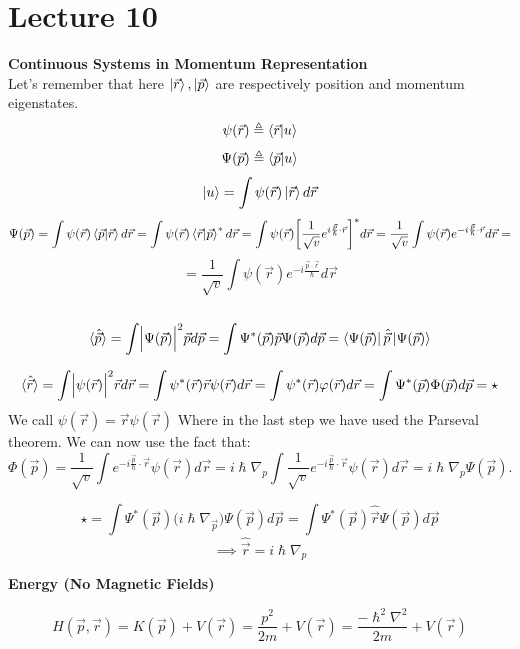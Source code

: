 \documentclass{article}
\begin{document}
\section{Lecture 10}
\textbf{Continuous Systems in Momentum Representation}\\
Let's remember that here $\ket{\vec{r}},\ket{\vec{p}}$ are respectively position and momentum eigenstates.
$$\psi(\vec{r}) \triangleq \bra{\vec{r}}\ket{u}$$
$$\Psi(\vec{p}) \triangleq \bra{\vec{p}}\ket{u}$$
$$\ket{u} = \int \psi (\vec{r}) \ket{\vec{r}} d\vec{r}$$
$$\Psi(\vec{p}) = \int \psi(\vec{r}) \bra{\vec{p}}\ket{\vec{r}}d\vec{r} = \int \psi(\vec{r}) \bra{\vec{r}}\ket{\vec{p}}^* d\vec{r} =  \int \psi(\vec{r}) \biggl[ \frac{1}{\sqrt{v}}e^{i\frac{\vec{p}}{\hslash}\cdot\vec{r}}\biggl]^*d\vec{r} =  \frac{1}{\sqrt{v}} \int \psi(\vec{r}) e^{-i\frac{\vec{p}}{\hslash}\cdot\vec{r}}d\vec{r} = $$
$$=\frac{1}{\sqrt{v}} \int \psi(\vec{r}) e^{-i \frac{\vec{p}\cdot\vec{r}}{\hslash}}d\vec{r}$$ \\ 

$$\langle \hat{\vec{p}} \rangle = \int \Bigl| \Psi(\vec{p}) \Bigl|^2 \vec{p} d\vec{p} = \int \Psi^* (\vec{p}) \vec{p} \Psi(\vec{p}) d\vec{p} = \bra{\Psi(\vec{p})}\hat{\vec{p}} \ket{\Psi(\vec{p})} $$ 

$$\langle \hat{\vec{r}} \rangle = \int \Bigl| \psi(\vec{r}) \Bigl|^2 \vec{r} d\vec{r} = \int \psi^* (\vec{r}) \vec{r} \psi(\vec{r}) d\vec{r} =\int \psi^* (\vec{r}) \varphi(\vec{r}) d\vec{r}  = \int \Psi^* (\vec{p})\Phi(\vec{p}) d\vec{p} =  \star $$
We call $\psi(\vec{r}) = \vec{r}\psi({\vec{r}})$
Where in the last step we have used the Parseval theorem. 
We can now use the fact that:
$$ \Phi(\vec{p}) = \frac{1}{\sqrt{v}} \int e^{-i \frac{\vec{p}}{\hslash}\cdot\vec{r}} \psi(\vec{r}) d\vec{r} = i \hslash \nabla_p \int \frac{1}{\sqrt{v}} e^{-i \frac{\vec{p}}{\hslash}\cdot\vec{r}} \psi(\vec{r}) d\vec{r} = i \hslash \nabla_p \Psi(\vec{p}).$$

$$ \star =  \int \Psi^*(\vec{p}) \bigl( i \hslash \nabla_{\vec{p}} \bigl) \Psi(\vec{p}) d\vec{p} = \int \Psi^*(\vec{p}) \hat{\vec{r}} \Psi(\vec{p})  d\vec{p}$$
$$\implies \hat{\vec{r}} = i\hslash \nabla_p$$

\textbf{Energy (No Magnetic Fields)}

$$H(\vec{p},\vec{r}) = K(\vec{p}) + V(\vec{r}) = \frac{p^2}{2m} + V(\vec{r}) = \frac{-\hslash^2 \nabla^2}{2m} + V(\vec{r})$$
\end{document}
